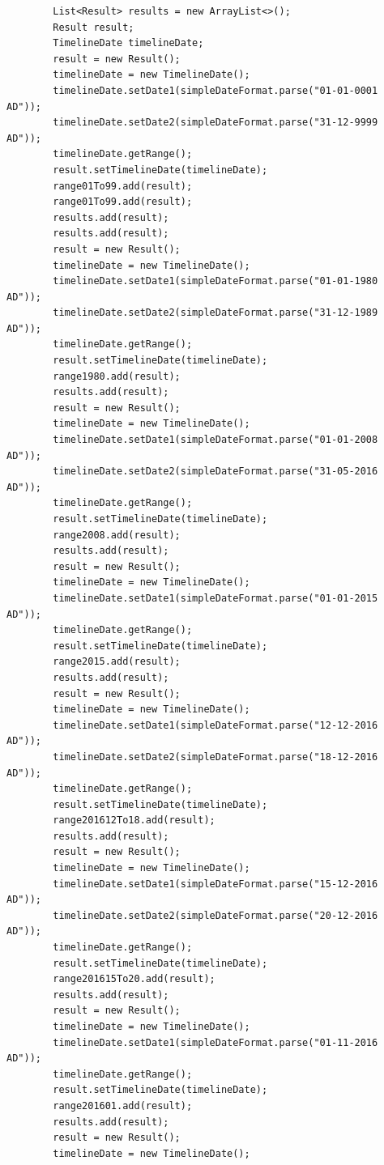 \begin{lstlisting}
        List<Result> results = new ArrayList<>();
        Result result;
        TimelineDate timelineDate;
        result = new Result();
        timelineDate = new TimelineDate();
        timelineDate.setDate1(simpleDateFormat.parse("01-01-0001 AD"));
        timelineDate.setDate2(simpleDateFormat.parse("31-12-9999 AD"));
        timelineDate.getRange();
        result.setTimelineDate(timelineDate);
        range01To99.add(result);
        range01To99.add(result);
        results.add(result);
        results.add(result);
        result = new Result();
        timelineDate = new TimelineDate();
        timelineDate.setDate1(simpleDateFormat.parse("01-01-1980 AD"));
        timelineDate.setDate2(simpleDateFormat.parse("31-12-1989 AD"));
        timelineDate.getRange();
        result.setTimelineDate(timelineDate);
        range1980.add(result);
        results.add(result);
        result = new Result();
        timelineDate = new TimelineDate();
        timelineDate.setDate1(simpleDateFormat.parse("01-01-2008 AD"));
        timelineDate.setDate2(simpleDateFormat.parse("31-05-2016 AD"));
        timelineDate.getRange();
        result.setTimelineDate(timelineDate);
        range2008.add(result);
        results.add(result);
        result = new Result();
        timelineDate = new TimelineDate();
        timelineDate.setDate1(simpleDateFormat.parse("01-01-2015 AD"));
        timelineDate.getRange();
        result.setTimelineDate(timelineDate);
        range2015.add(result);
        results.add(result);
        result = new Result();
        timelineDate = new TimelineDate();
        timelineDate.setDate1(simpleDateFormat.parse("12-12-2016 AD"));
        timelineDate.setDate2(simpleDateFormat.parse("18-12-2016 AD"));
        timelineDate.getRange();
        result.setTimelineDate(timelineDate);
        range201612To18.add(result);
        results.add(result);
        result = new Result();
        timelineDate = new TimelineDate();
        timelineDate.setDate1(simpleDateFormat.parse("15-12-2016 AD"));
        timelineDate.setDate2(simpleDateFormat.parse("20-12-2016 AD"));
        timelineDate.getRange();
        result.setTimelineDate(timelineDate);
        range201615To20.add(result);
        results.add(result);
        result = new Result();
        timelineDate = new TimelineDate();
        timelineDate.setDate1(simpleDateFormat.parse("01-11-2016 AD"));
        timelineDate.getRange();
        result.setTimelineDate(timelineDate);
        range201601.add(result);
        results.add(result);
        result = new Result();
        timelineDate = new TimelineDate();

\end{lstlisting}
